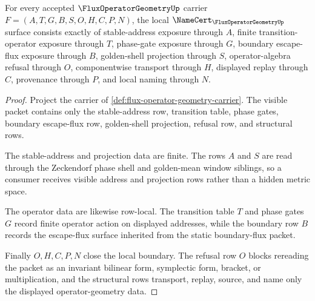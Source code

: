 \begin{theorem}
\label{thm:flux-operator-geometry-namecert-obligations}
For every accepted $\FluxOperatorGeometryUp$ carrier $F=(A,T,G,B,S,O,H,C,P,N)$, the local $\NameCert_{\FluxOperatorGeometryUp}$ surface consists exactly of stable-address exposure through $A$, finite transition-operator exposure through $T$, phase-gate exposure through $G$, boundary escape-flux exposure through $B$, golden-shell projection through $S$, operator-algebra refusal through $O$, componentwise transport through $H$, displayed replay through $C$, provenance through $P$, and local naming through $N$.
\end{theorem}
\begin{proof}
Project the carrier of \autoref{def:flux-operator-geometry-carrier}. The visible packet contains only the stable-address row, transition table, phase gates, boundary escape-flux row, golden-shell projection, refusal row, and structural rows.

The stable-address and projection data are finite. The rows $A$ and $S$ are read through the Zeckendorf phase shell and golden-mean window siblings, so a consumer receives visible address and projection rows rather than a hidden metric space.

The operator data are likewise row-local. The transition table $T$ and phase gates $G$ record finite operator action on displayed addresses, while the boundary row $B$ records the escape-flux surface inherited from the static boundary-flux packet.

Finally $O,H,C,P,N$ close the local boundary. The refusal row $O$ blocks rereading the packet as an invariant bilinear form, symplectic form, bracket, or multiplication, and the structural rows transport, replay, source, and name only the displayed operator-geometry data.
\end{proof}

